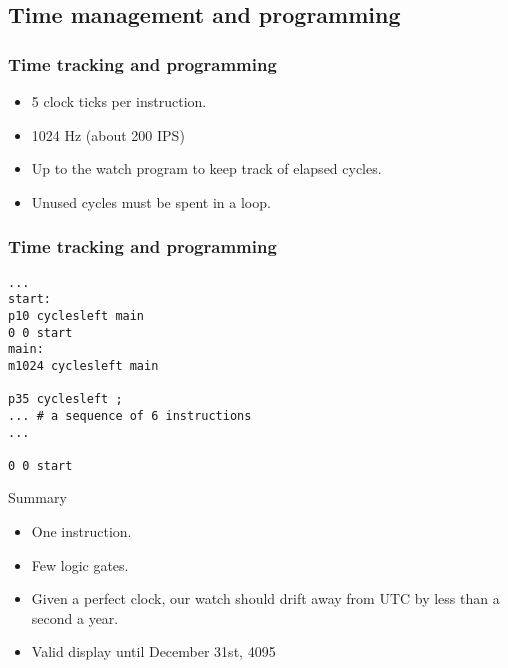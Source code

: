 \documentclass{beamer}
\begin{document}
\subsection{Time management and programming}
\begin{frame}
  \frametitle{Time tracking and programming}
  \begin{itemize}
    \item 5 clock ticks per instruction.
    \item 1024 Hz (about 200 IPS)
    \item<2-> Up to the watch program to keep track of elapsed cycles.
    \item<3-> Unused cycles must be spent in a loop.
  \end{itemize}
\end{frame}

\begin{frame}[fragile]
  \frametitle{Time tracking and programming}
    \begin{verbatim}
...
start:
p10 cyclesleft main
0 0 start
main:
m1024 cyclesleft main

p35 cyclesleft ;
... # a sequence of 6 instructions
...

0 0 start
    \end{verbatim}
\end{frame}

\begin{frame}{Summary}
  \begin{itemize}
    \item<2-> One instruction.
    \item<3-> Few logic gates. %
    \item<4-> Given a perfect clock, our watch should drift away from UTC
      by less than a second a year. %
    \item<5-> Valid display until December 31st, 4095
  \end{itemize}
\end{frame}
\end{document}
